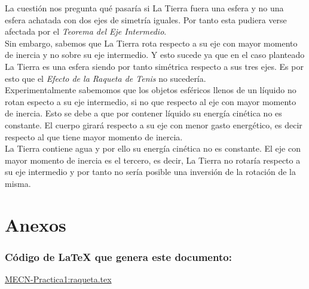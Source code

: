 \documentclass[11pt]{article}
\begin{document}
			\noindent La cuestión nos pregunta qué pasaría si La Tierra fuera una esfera y no una esfera achatada con dos ejes de simetría iguales. Por tanto esta pudiera verse afectada por el \textit{Teorema del Eje Intermedio}.\\
			
			\noindent Sin embargo, sabemos que La Tierra rota respecto a su eje con mayor momento de inercia y no sobre su eje intermedio. Y esto sucede ya que en el caso planteado La Tierra es una esfera siendo por tanto simétrica respecto a sus tres ejes. Es por esto que el \textit{Efecto de la Raqueta de Tenis} no sucedería.\\
                                    
			\noindent Experimentalmente sabemomos que los objetos esféricos llenos de un líquido no rotan especto a su eje intermedio, si no que respecto al eje con mayor momento de inercia. Esto se debe a que por contener líquido su energía cinética no es constante. El cuerpo girará respecto a su eje con menor gasto energético, es decir respecto al que tiene mayor momento de inercia.\\
            
            \noindent La Tierra contiene agua y por ello su energía cinética no es constante. El eje con mayor momento de inercia es el tercero, es decir, La Tierra no rotaría respecto a su eje intermedio y por tanto no sería posible una inversión de la rotación de la misma.\\
    \section{Anexos}
        \subsubsection*{Código de LaTeX que genera este documento:}
            \href{https://www.overleaf.com/read/ghsbdxtsnhtj#09bdf3}{MECN-Practica1:raqueta.tex}
\end{document}
